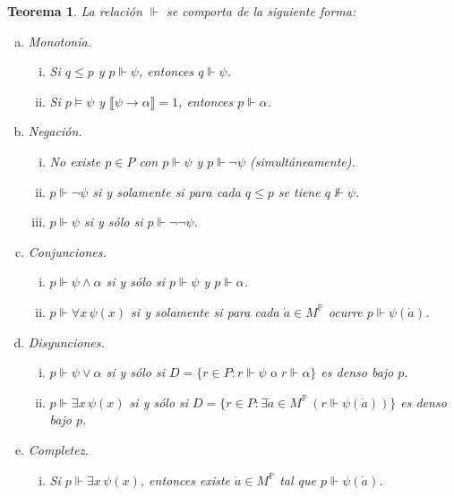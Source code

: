 \documentclass[letterpaper,DIV=15,12pt]{scrartcl}
\newtheorem{teorema}{Teorema}
\newcommand{\tq}{:}
\newcommand{\Bv}[1]{\llbracket #1 \rrbracket}
\begin{document}
    \begin{teorema}
        La relación $\Vdash$ se comporta de la siguiente forma:
        \begin{enumerate}[a)]
            \item Monotonía.
                \begin{enumerate}[i)]
            \item Si $q \leq p$ y $p \Vdash \psi$, entonces $q \Vdash \psi$.
            \item Si $p \vDash \psi$ y $\Bv{\psi \to \alpha}=1$, entonces $p \Vdash \alpha$.
                \end{enumerate}
            \item Negación.
                \begin{enumerate}[i)]
            \item No existe $p \in P$ con $p \Vdash \psi$ y $p \Vdash \lnot \psi$ (simultáneamente).
            \item $p \Vdash \lnot \psi$ si y solamente si para cada $q \leq p$ se tiene $q \not\Vdash \psi$.
            \item $p \Vdash \psi$ si y sólo si $p \Vdash \lnot \lnot \psi$.
                \end{enumerate}
            \item Conjunciones.
                \begin{enumerate}[i)]
            \item $p \Vdash \psi \land \alpha$ si y sólo si $p \Vdash \psi$ y $p \Vdash \alpha$.
            \item $p \Vdash \forall x \, \psi(x)$ si y solamente si para cada $\dot{a} \in M^{\mathbb{P}}$ ocurre $p \Vdash \psi(\dot{a})$.
                \end{enumerate}
            \item Disyunciones.
                \begin{enumerate}[i)]
                    \item $p \Vdash \psi \lor \alpha$ si y sólo si $D=\{r \in P \tq r \Vdash \psi \text{ o } r \Vdash \alpha \}$ es denso bajo $p$.
                    \item $p \Vdash \exists x \, \psi (x)$ si y sólo si $D=\{r \in P \tq \exists \dot{a} \in M^{\mathbb{P}} \, ( r \Vdash \psi(\dot{a}) )\}$ es denso bajo $p$.
                \end{enumerate}
            \item Completez.
                \begin{enumerate}[i)]
                    \item Si $p \Vdash \exists x \, \psi(x)$, entonces existe $\dot{a} \in M^{\mathbb{P}}$ tal que $p \Vdash \psi(\dot{a})$.
                \end{enumerate}
      \end{enumerate}
    \end{teorema}
\end{document}

